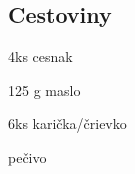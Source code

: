 \setcounter{step}{0}
\subsection{Cestoviny}

\begin{ingredient}
\begin{main}
	\item 4ks cesnak
	\item 125 g maslo
	\item 6ks karička/črievko
  \item pečivo
\end{main}
\end{ingredient}%
\begin{recipe}


\end{recipe}

\begin{notes}

\end{notes}	
